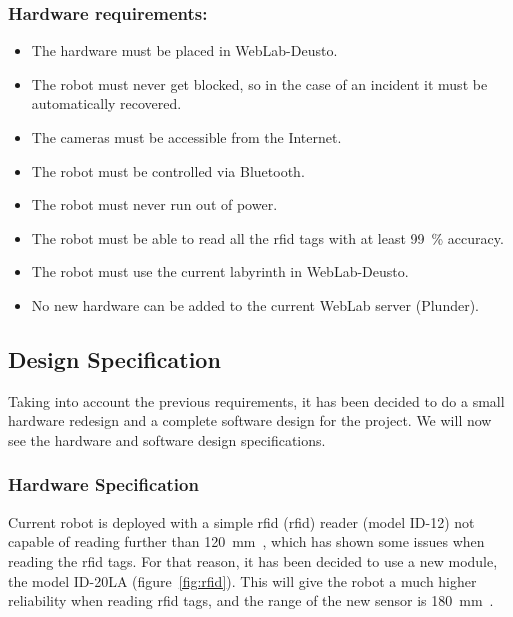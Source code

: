 \subsubsection{Hardware requirements:}

\begin{itemize}
	\item The hardware must be placed in WebLab-Deusto.
	\item The robot must never get blocked, so in the case of an incident it must be automatically
	recovered.
	\item The cameras must be accessible from the Internet.
	\item The robot must be controlled via Bluetooth.
	\item The robot must never run out of power.
	\item The robot must be able to read all the \acrshort{rfid} tags with at least 99~\% accuracy.
	\item The robot must use the current labyrinth in WebLab-Deusto.
	\item No new hardware can be added to the current WebLab server (Plunder).
\end{itemize}

\subsection{Design Specification}

Taking into account the previous requirements, it has been decided to do a small hardware redesign
and a complete software design for the project. We will now see the hardware and software design
specifications.

\subsubsection{Hardware Specification}

Current robot is deployed with a simple \acrshort{rfid} (\acrlong{rfid}) reader (model ID-12) not
capable of reading further than 120~mm~\cite{rfid}, which has shown some issues when reading the
\acrshort{rfid} tags. For that reason, it has been decided to use a new module, the model ID-20LA
(figure~\ref{fig:rfid}). This will give the robot a much higher reliability when reading
\acrshort{rfid} tags, and the range of the new sensor is 180~mm~\cite{rfid}.

